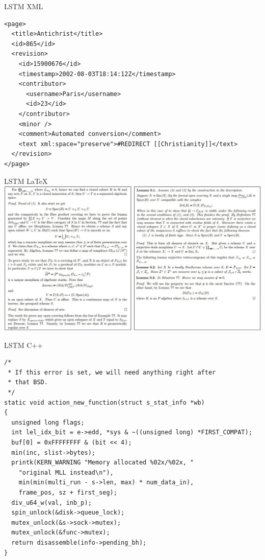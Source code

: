\documentclass[10pt,xcolor=dvipsnames]{beamer}
\begin{document}
\begin{frame}[fragile]{LSTM XML}
  \begin{lstlisting}
<page>
  <title>Antichrist</title>
  <id>865</id>
  <revision>
    <id>15900676</id>
    <timestamp>2002-08-03T18:14:12Z</timestamp>
    <contributor>
      <username>Paris</username>
      <id>23</id>
    </contributor>
    <minor />
    <comment>Automated conversion</comment>
    <text xml:space="preserve">#REDIRECT [[Christianity]]</text>
  </revision>
</page>
  \end{lstlisting}
\end{frame}

\begin{frame}{LSTM \LaTeX}
  \includegraphics[width=\linewidth]{fig/lstm-latex-1.jpeg}
\end{frame}

\begin{frame}[fragile]{LSTM C++}
\begin{lstlisting}
/*
 * If this error is set, we will need anything right after
 * that BSD.
 */
static void action_new_function(struct s_stat_info *wb)
{
  unsigned long flags;
  int lel_idx_bit = e->edd, *sys & ~((unsigned long) *FIRST_COMPAT);
  buf[0] = 0xFFFFFFFF & (bit << 4);
  min(inc, slist->bytes);
  printk(KERN_WARNING "Memory allocated %02x/%02x, "
    "original MLL instead\n"),
    min(min(multi_run - s->len, max) * num_data_in),
    frame_pos, sz + first_seg);
  div_u64_w(val, inb_p);
  spin_unlock(&disk->queue_lock);
  mutex_unlock(&s->sock->mutex);
  mutex_unlock(&func->mutex);
  return disassemble(info->pending_bh);
}
\end{lstlisting}
\end{frame}
\end{document}
